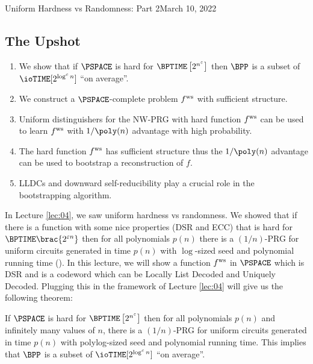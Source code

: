 \newcommand{\fn}{\mathbb{F}_n}
\newcommand\antipi{\rotatebox[origin=c]{180}{$\Pi$}}

\begin{lecture}{8}{Uniform Hardness vs Randomness: Part 2}{March 10, 2022}\label{lec:08}

\subsection*{The Upshot}

\begin{enumerate}
	\item We show that if $\PSPACE$ is hard for $\BPTIME\left[2^{n^\eps}\right]$ then $\BPP$ is a subset of \\ $\ioTIME[2^{\log^c n}]$ ``on average''.
	\item We construct a $\PSPACE$-complete problem $ f^{\text{ws}} $ with sufficient structure.
	\item Uniform distinguishers for the NW-PRG with hard function $ f^{\text{ws}} $ can be
	used to learn $ f^{\text{ws}} $ with $1/\poly(n)$ advantage with high probability.
	\item The hard function $ f^{\text{ws}} $ has sufficient structure thus the $1/\poly(n)$
	advantage can be used to bootstrap a reconstruction of $f$.
	\item LLDCs and downward self-reducibility play a crucial role in the
	bootstrapping algorithm.
\end{enumerate}

In Lecture \ref{lec:04}, we saw uniform hardness vs randomness. We showed that if there is a function with some nice properties (DSR and ECC) that is hard for $\BPTIME\brac{2^{\eps n}}$ then for all polynomials $p(n)$ there is a $(1 / n)$-PRG for uniform circuits generated in time $p(n)$ with $\log$-sized seed and polynomial running time (). 
In this lecture, we will show a function $ f^{\text{ws}} $ in $\PSPACE$ which is DSR and  is a codeword which can be Locally List Decoded and Uniquely Decoded. Plugging this in the framework of Lecture \ref{lec:04} will give us the following theorem:
\begin{theorem}\label{thm:uniform-hard-random-PSPACE}
	If $\PSPACE$ is hard for $\BPTIME\left[2^{n^\eps}\right]$ then for all polynomials $p(n)$ and infinitely many values of $n$, there is a $(1/n)$-PRG for uniform circuits generated in time $p(n)$ with polylog-sized seed and polynomial running time. This implies that $\BPP$ is a subset of $\ioTIME[2^{\log^c n}]$ ``on average''.
\end{theorem}



\end{lecture}
